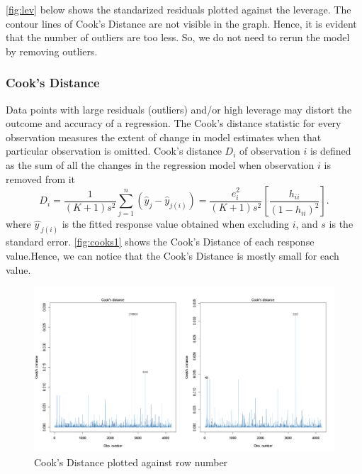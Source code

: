 \documentclass[12pt]{article}
\begin{document}
\autoref{fig:lev} below shows the standarized residuals plotted against the leverage. The contour lines of Cook's Distance are not visible in the graph. Hence, it is evident that the number of outliers are too less. So, we do not need to rerun the model by removing outliers.

\subsubsection{Cook's Distance}
Data points with large residuals (outliers) and/or high leverage may distort the outcome and accuracy of a regression.
The Cook’s distance statistic for every observation measures the extent of change in model estimates when that particular observation is omitted. 
Cook's distance $D_{i}$ of observation $i$ is defined as the sum of all the changes in the regression model when observation $i$ is removed from it
$$D_{i}={\frac {1}{(K+1)s^{2}} \sum_ {j=1}^{n}(\hat y_j-\hat y_{j(i)})}={\frac {e_{i}^{2}}{(K+1)s^{2}}}\left[{\frac {h_{ii}}{(1-h_{ii})^{2}}}\right].$$
where ${\widehat {y\, }}_{j(i)}$ is the fitted response value obtained when excluding $i$, and $s$ is the standard error.
\autoref{fig:cooks1} shows the Cook's Distance of each response value.Hence, we can notice that the Cook's Distance is mostly small for each value.
\begin{figure}[H]
    \centering
    \includegraphics[width=18cm]{3.3 images/3.3.4.2.png}
    \caption{Cook's Distance plotted against row number}
    \label{fig:cooks1}
\end{figure}
\end{document}
